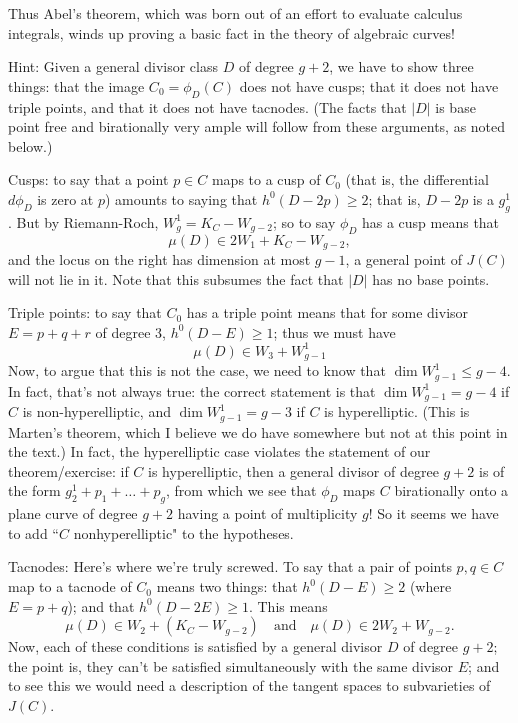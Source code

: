 Thus Abel's theorem, which was born out of an effort to evaluate calculus integrals, winds up proving a basic fact in the theory of algebraic curves!


Hint: Given a general divisor class $D$ of degree $g+2$, we have to show three things: that the image $C_0 = \phi_D(C)$ does not have cusps; that it does not have triple points, and that it does not have tacnodes. (The facts that $|D|$ is base point free and birationally very ample will follow from these arguments, as noted below.)

Cusps: to say that a point $p \in C$ maps to a cusp of $C_0$ (that is, the differential $d\phi_D$ is zero at $p$) amounts to saying that $h^0(D-2p) \geq 2$; that is, $D-2p$ is a $g^1_g$. But by Riemann-Roch, $W^1_g = K_C - W_{g-2}$; so to say $\phi_D$ has a cusp means that
$$
\mu(D) \in 2W_1 + K_C - W_{g-2},
$$
and the locus on the right has dimension at most $g-1$, a general point of $J(C)$ will not lie in it. Note that this subsumes the fact that $|D|$ has no base points.

Triple points: to say that $C_0$ has a triple point means that for some divisor $E = p+q+r$ of degree 3, $h^0(D-E) \geq 1$; thus we must have 
$$
\mu(D) \in W_3 + W^1_{g-1}
$$
Now, to argue that this is not the case, we need to know that $\dim W^1_{g-1} \leq g-4$. In fact, that's not always true: the correct statement is that $\dim W^1_{g-1} = g-4$ if $C$ is non-hyperelliptic, and $\dim W^1_{g-1} = g-3$ if $C$ is hyperelliptic. (This is Marten's theorem, which I believe we do have somewhere but not at this point in the text.) In fact, the hyperelliptic case violates the statement of our theorem/exercise: if $C$ is hyperelliptic, then a general divisor of degree $g+2$ is of the form $g^1_2 + p_1+ \dots + p_g$, from which we see that $\phi_D$ maps $C$ birationally onto a plane curve of degree $g+2$ having a point of multiplicity $g$! So it seems we have to add ``$C$ nonhyperelliptic" to the hypotheses.

Tacnodes: Here's where we're truly screwed. To say that a pair of points $p, q \in C$ map to a tacnode of $C_0$ means two things: that $h^0(D-E) \geq 2$ (where $E = p+q$); and that $h^0(D-2E) \geq 1$. This means
$$
\mu(D) \in W_2 + (K_C - W_{g-2}) \quad \text{and} \quad \mu(D) \in 2W_2 + W_{g-2}.
$$
Now, each of these conditions is satisfied by a general divisor $D$ of degree $g+2$; the point is, they can't be satisfied simultaneously with the same divisor $E$; and to see this we would need a description of the tangent spaces to subvarieties of $J(C)$.

